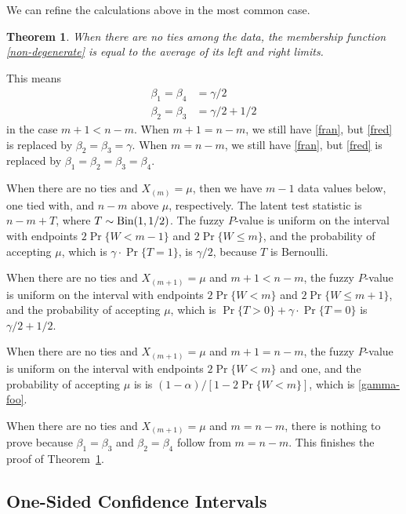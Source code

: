 \documentclass{article}
\newcommand{\BinomialDis}{\text{\upshape Bin}}
\newtheorem{theorem}{Theorem}
\begin{document}
We can refine the calculations above in the most common case.
\begin{theorem} \label{th:half}
When there are no ties among the data, the membership
function \eqref{non-degenerate} is equal to the average of its left
and right limits.
\end{theorem}
This means
\begin{subequations}
\begin{align}
   \beta_1 = \beta_4 & = \gamma / 2
   \label{fran}
   \\
   \beta_2 = \beta_3 & = \gamma / 2 + 1 / 2
   \label{fred}
\end{align}
\end{subequations}
in the case $m + 1 < n - m$.
When $m + 1 = n - m$, we still have \eqref{fran},
but \eqref{fred} is replaced by $\beta_2 = \beta_3 = \gamma$.
When $m = n - m$, we still have \eqref{fran},
but \eqref{fred} is replaced by $\beta_1 = \beta_2 = \beta_3 = \beta_4$.

When there are no ties and $X_{(m)} = \mu$,
then we have $m - 1$ data values below, one tied with, and $n - m$
above $\mu$, respectively.
The latent test statistic is $n - m + T$,
where $T \sim \BinomialDis(1, 1 / 2)$.
The fuzzy $P$-value is uniform on the interval
with endpoints $2 \Pr \{ W < m - 1 \}$ and $2 \Pr \{ W \le m \}$,
and the probability of accepting $\mu$, which is
$\gamma \cdot \Pr \{ T = 1 \}$,
is $\gamma / 2$, because $T$ is Bernoulli.

When there are no ties and $X_{(m + 1)} = \mu$
and $m + 1 < n - m$,
the fuzzy $P$-value is uniform on the interval
with endpoints $2 \Pr \{ W < m \}$ and $2 \Pr \{ W \le m + 1 \}$,
and the probability of accepting $\mu$, which is
$\Pr \{ T > 0 \} + \gamma \cdot \Pr \{ T = 0 \}$
is $\gamma / 2 + 1 / 2$.

When there are no ties and $X_{(m + 1)} = \mu$
and $m + 1 = n - m$,
the fuzzy $P$-value is uniform on the interval
with endpoints $2 \Pr \{ W < m \}$ and one,
and the probability of accepting $\mu$ is
is $(1 - \alpha) / [1 - 2 \Pr\{W < m\}]$, which is \eqref{gamma-foo}.

When there are no ties and $X_{(m + 1)} = \mu$
and $m = n - m$, there is nothing to prove because $\beta_1 = \beta_3$
and $\beta_2 = \beta_4$ follow from $m = n - m$.
This finishes the proof of Theorem~\ref{th:half}.

\subsection{One-Sided Confidence Intervals}
\end{document}
